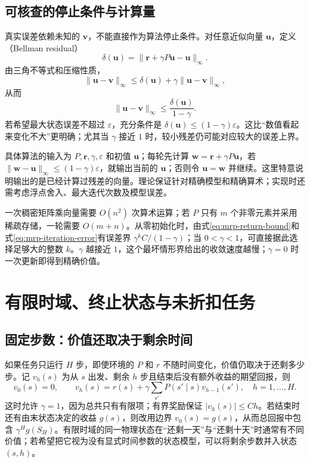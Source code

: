 \documentclass[UTF8]{ctexart}
\begin{document}
\subsection{可核查的停止条件与计算量}

真实误差依赖未知的 $\boldsymbol v$，不能直接作为算法停止条件。对任意近似向量 $\boldsymbol u$，定义（Bellman residual）
\[
  \delta(\boldsymbol u)=\|\boldsymbol r+\gamma P\boldsymbol u-\boldsymbol u\|_\infty.
\]
由三角不等式和压缩性质，
\[
  \|\boldsymbol u-\boldsymbol v\|_\infty
  \leq\delta(\boldsymbol u)+\gamma\|\boldsymbol u-\boldsymbol v\|_\infty,
\]
从而
\begin{equation}
  \|\boldsymbol u-\boldsymbol v\|_\infty
  \leq\frac{\delta(\boldsymbol u)}{1-\gamma}.
  \label{eq:mrp-residual-bound}
\end{equation}
若希望最大状态误差不超过 $\varepsilon$，充分条件是 $\delta(\boldsymbol u)\leq(1-\gamma)\varepsilon$。这比“数值看起来变化不大”更明确；尤其当 $\gamma$ 接近 $1$ 时，较小残差仍可能对应较大的误差上界。

具体算法的输入为 $P,\boldsymbol r,\gamma,\varepsilon$ 和初值 $\boldsymbol u$；每轮先计算 $\boldsymbol w=\boldsymbol r+\gamma P\boldsymbol u$，若 $\|\boldsymbol w-\boldsymbol u\|_\infty\leq(1-\gamma)\varepsilon$，就输出当前的 $\boldsymbol u$；否则令 $\boldsymbol u=\boldsymbol w$ 并继续。这里特意说明输出的是已经计算过残差的向量。理论保证针对精确模型和精确算术；实现时还需考虑浮点舍入、最大迭代次数及模型误差。

一次稠密矩阵乘向量需要 $O(n^2)$ 次算术运算；若 $P$ 只有 $m$ 个非零元素并采用稀疏存储，一轮需要 $O(m+n)$。从零初始化时，由式\eqref{eq:mrp-return-bound}和式\eqref{eq:mrp-iteration-error}有误差界 $\gamma^kC/(1-\gamma)$；当 $0<\gamma<1$，可直接据此选择足够大的整数 $k$。$\gamma$ 越接近 $1$，这个最坏情形界给出的收敛速度越慢；$\gamma=0$ 时一次更新即得到精确价值。

\section{有限时域、终止状态与未折扣任务}
\label{sec:mrp-undiscounted}

\subsection{固定步数：价值还取决于剩余时间}

如果任务只运行 $H$ 步，即使环境的 $P$ 和 $r$ 不随时间变化，价值仍取决于还剩多少步。记 $v_h(s)$ 为从 $s$ 出发、剩余 $h$ 步且结束后没有额外收益的期望回报，则
\begin{equation}
  v_0(s)=0,\qquad
  v_h(s)=r(s)+\gamma\sum_{s'}P(s'\mid s)v_{h-1}(s'),
  \quad h=1,\ldots,H.
  \label{eq:mrp-finite-horizon}
\end{equation}
这时允许 $\gamma=1$，因为总共只有有限项；有界奖励保证 $|v_h(s)|\leq Ch$。若结束时还有由末状态决定的收益 $g(s)$，则改用边界 $v_0(s)=g(s)$，从而总回报中包含 $\gamma^Hg(S_H)$。有限时域的同一物理状态在“还剩一天”与“还剩十天”时通常有不同价值；若希望把它视为没有显式时间参数的状态模型，可以将剩余步数并入状态 $(s,h)$。
\end{document}
